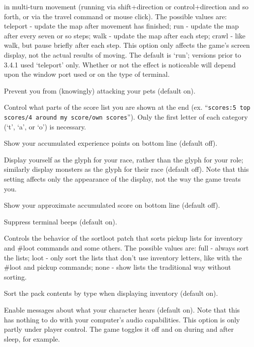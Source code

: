 in multi-turn movement (running via shift+direction or control+direction
and so forth, or via the travel command or mouse click).
The possible values are:
teleport - update the map after movement has finished;
run - update the map after every seven or so steps;
walk - update the map after each step;
crawl - like walk, but pause briefly after each step.
This option only affects the game's screen display, not the actual
results of moving.  The default is `run'; versions prior to 3.4.1 
used `teleport' only.  Whether or not the effect is noticeable will
depend upon the window port used or on the type of terminal.
\item[\tb{safe\_pet}]
Prevent you from (knowingly) attacking your pets (default on).
\item[\tb{scores}]
Control what parts of the score list you are shown at the end (ex.
``{\tt scores:5 top scores/4 around my score/own scores}'').  Only the first
letter of each category (`t', `a', or `o') is necessary.
\item[\tb{showexp}]
Show your accumulated experience points on bottom line (default off).
\item[\tb{showrace}]
Display yourself as the glyph for your race, rather than the glyph
for your role; similarly display monsters as the glyph for their race
(default off).  Note that this setting affects only the appearance of
the display, not the way the game treats you.
\item[\tb{showscore}]
Show your approximate accumulated score on bottom line (default off).
\item[\tb{"silent  "}]
Suppress terminal beeps (default on).
\item[\tb{sortloot}]
Controls the behavior of the sortloot patch that sorts pickup lists for
inventory and \#loot commands and some others.
The possible values are:
full - always sort the lists;
loot - only sort the lists that don't use inventory
       letters, like with the \#loot and pickup commands;
none - show lists the traditional way without sorting.
\item[\tb{sortpack}]
Sort the pack contents by type when displaying inventory (default on).
\item[\tb{sound}]
Enable messages about what your character hears (default on).
Note that this has nothing to do with your computer's audio capabilities.
This option is only partly under player control.  The game toggles it
off and on during and after sleep, for example.
\item[\tb{sparkle}]
